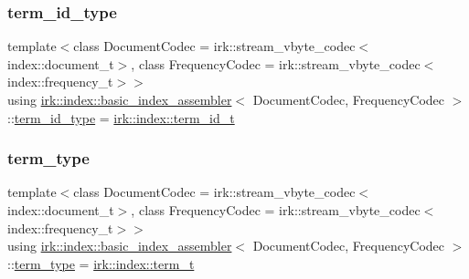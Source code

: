 \mbox{\label{classirk_1_1index_1_1basic__index__assembler_ad14cbad92a385bd06c0d16b38ab771ec}} 
\subsubsection{\texorpdfstring{term\+\_\+id\+\_\+type}{term\_id\_type}}
{\footnotesize\ttfamily template$<$class Document\+Codec  = irk\+::stream\+\_\+vbyte\+\_\+codec$<$index\+::document\+\_\+t$>$, class Frequency\+Codec  = irk\+::stream\+\_\+vbyte\+\_\+codec$<$index\+::frequency\+\_\+t$>$$>$ \\
using \mbox{\hyperlink{classirk_1_1index_1_1basic__index__assembler}{irk\+::index\+::basic\+\_\+index\+\_\+assembler}}$<$ Document\+Codec, Frequency\+Codec $>$\+::\mbox{\hyperlink{classirk_1_1index_1_1basic__index__assembler_ad14cbad92a385bd06c0d16b38ab771ec}{term\+\_\+id\+\_\+type}} =  \mbox{\hyperlink{namespaceirk_1_1index_ae2ce3a02969196fe6dab4443ed2007d5}{irk\+::index\+::term\+\_\+id\+\_\+t}}}

\mbox{\label{classirk_1_1index_1_1basic__index__assembler_ad748f84f622d5a988c5bf02478ab4686}} 
\subsubsection{\texorpdfstring{term\+\_\+type}{term\_type}}
{\footnotesize\ttfamily template$<$class Document\+Codec  = irk\+::stream\+\_\+vbyte\+\_\+codec$<$index\+::document\+\_\+t$>$, class Frequency\+Codec  = irk\+::stream\+\_\+vbyte\+\_\+codec$<$index\+::frequency\+\_\+t$>$$>$ \\
using \mbox{\hyperlink{classirk_1_1index_1_1basic__index__assembler}{irk\+::index\+::basic\+\_\+index\+\_\+assembler}}$<$ Document\+Codec, Frequency\+Codec $>$\+::\mbox{\hyperlink{classirk_1_1index_1_1basic__index__assembler_ad748f84f622d5a988c5bf02478ab4686}{term\+\_\+type}} =  \mbox{\hyperlink{namespaceirk_1_1index_a7c2517c1f98e5b5f30ba3ab2f837caf6}{irk\+::index\+::term\+\_\+t}}}



